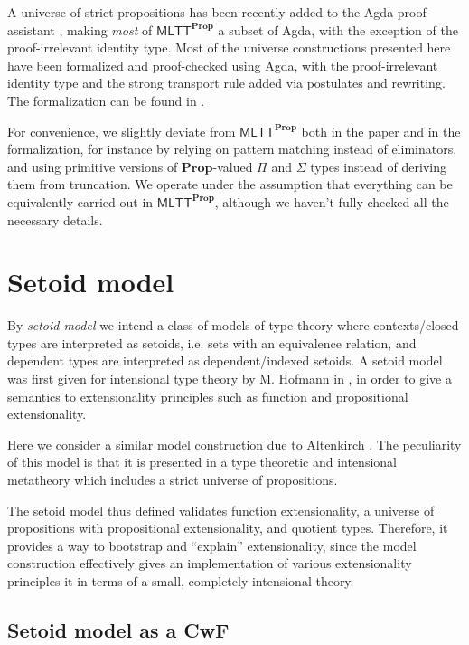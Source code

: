 \documentclass{easychair}
\newcommand{\mlttp}{\textsf{MLTT}^{\mProp}}
\newcommand{\mProp}{\mathbf{Prop}}
\begin{document}
A universe of strict propositions has been recently added to the Agda proof
assistant \cite{agda-prop}, making \emph{most} of $\mlttp$ a subset of Agda,
with the exception of the proof-irrelevant identity type. Most of the universe
constructions presented here have been formalized and proof-checked using Agda,
with the proof-irrelevant identity type and the strong transport rule added via
postulates and rewriting. The formalization can be found in \cite{agda-code}.

For convenience, we slightly deviate from $\mlttp$ both in the paper and in the
formalization, for instance by relying on pattern matching instead of
eliminators, and using primitive versions of $\mProp$-valued $\Pi$ and $\Sigma$
types instead of deriving them from truncation. We operate under the assumption
that everything can be equivalently carried out in $\mlttp$, although we haven't
fully checked all the necessary details.

\section{Setoid model}\label{setoid-model}

By \emph{setoid model} we intend a class of models of type theory where
contexts/closed types are interpreted as setoids, i.e. sets with an equivalence
relation, and dependent types are interpreted as dependent/indexed setoids.
%
A setoid model was first given for intensional type theory by M. Hofmann in
\cite{hofmann}, in order to give a semantics to extensionality principles such
as function and propositional extensionality.

Here we consider a similar model construction due to Altenkirch
\cite{setoid99}. The peculiarity of this model is that it is presented in a type
theoretic and intensional metatheory which includes a strict universe of
propositions.

The setoid model thus defined validates function extensionality, a universe of
propositions with propositional extensionality, and quotient types. Therefore,
it provides a way to bootstrap and ``explain'' extensionality, since the model
construction effectively gives an implementation of various extensionality
principles it in terms of a small, completely intensional theory.

\subsection{Setoid model as a CwF}
\end{document}
